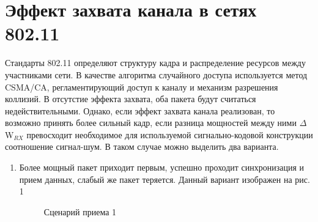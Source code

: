 \documentclass{llncs}
\begin{document}
\section{Эффект захвата канала в сетях 802.11}
Стандарты 802.11 определяют структуру кадра и распределение ресурсов между участниками сети. В качестве алгоритма случайного доступа используется метод CSMA/CA, регламентирующий  доступ к каналу и механизм разрешения коллизий. В отсутстие эффекта захвата, оба пакета будут считаться недействительными. Однако, если эффект захвата канала реализован, то возможно принять более сильный кадр, если разница мощностей между ними $\Delta$W$_{RX}$ превосходит необходимое для используемой сигнально-кодовой конструкции соотношение сигнал-шум. В таком случае можно выделить два варианта. 
\begin{enumerate}
\item Более мощный пакет приходит первым, успешно проходит синхронизация и прием данных, слабый же пакет теряется. Данный вариант изображен на рис. 1\\

\begin{figure}[]
\caption{Сценарий приема 1}
\label{ris:image}
\end{figure}


\end{enumerate}
\end{document}
